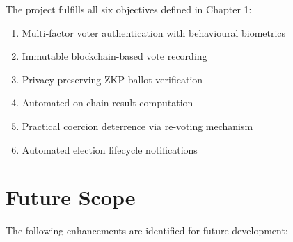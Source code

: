 \documentclass[oneside,a4paper,12pt]{book}
\begin{document}
The project fulfills all six objectives defined in Chapter 1:
\begin{enumerate}[leftmargin=1.5cm]
    \item Multi-factor voter authentication with behavioural biometrics
    \item Immutable blockchain-based vote recording
    \item Privacy-preserving ZKP ballot verification
    \item Automated on-chain result computation
    \item Practical coercion deterrence via re-voting mechanism
    \item Automated election lifecycle notifications
\end{enumerate}

\section{Future Scope}
The following enhancements are identified for future development:
\end{document}
